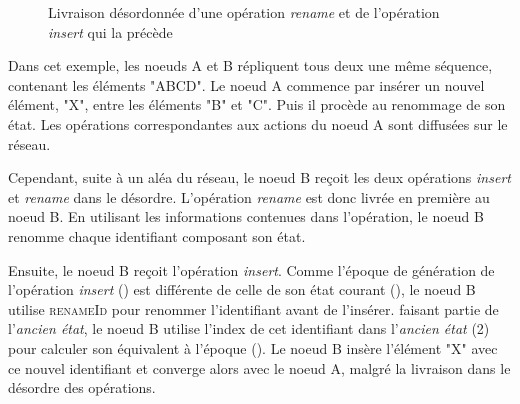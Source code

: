 \begin{figure}[!ht]
{
  }
  \caption{Livraison désordonnée d'une opération \emph{rename} et de l'opération \emph{insert} qui la précède}
  \label{fig:rls-out-of-order-rename}
\end{figure}

Dans cet exemple, les noeuds A et B répliquent tous deux une même séquence, contenant les éléments "ABCD".
Le noeud A commence par insérer un nouvel élément, "X", entre les éléments "B" et "C".
Puis il procède au renommage de son état.
Les opérations correspondantes aux actions du noeud A sont diffusées sur le réseau.

Cependant, suite à un aléa du réseau, le noeud B reçoit les deux opérations \emph{insert} et \emph{rename} dans le désordre.
L'opération \emph{rename} est donc livrée en première au noeud B.
En utilisant les informations contenues dans l'opération, le noeud B renomme chaque identifiant composant son état.

Ensuite, le noeud B reçoit l'opération \emph{insert}.
Comme l'époque de génération de l'opération \emph{insert} () est différente de celle de son état courant (), le noeud B utilise \textsc{renameId} pour renommer l'identifiant avant de l'insérer.
 faisant partie de l'\emph{ancien état}, le noeud B utilise l'index de cet identifiant dans l'\emph{ancien état} (2) pour calculer son équivalent à l'époque  ().
Le noeud B insère l'élément "X" avec ce nouvel identifiant et converge alors avec le noeud A, malgré la livraison dans le désordre des opérations.
